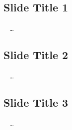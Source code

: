 \subsection{Slide Title 1}
\begin{frame}{~}
	\ldots
\end{frame}

\subsection{Slide Title 2}
\begin{frame}{~}
	\ldots
\end{frame}

\subsection{Slide Title 3}
\begin{frame}{~}
	\ldots
\end{frame}

